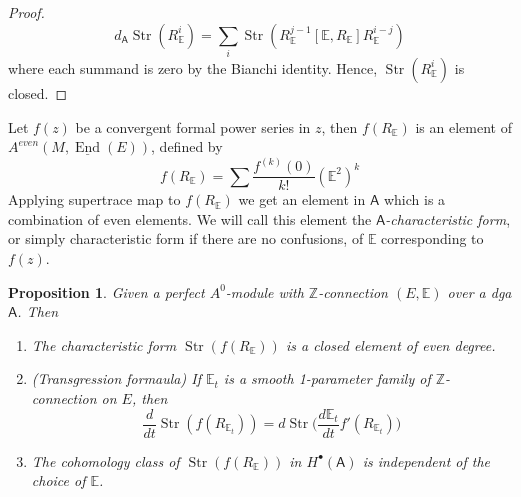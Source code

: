 \documentclass[12pt]{amsart}
\newtheorem{prop}[thm]{Proposition}
\theoremstyle{definition}
\theoremstyle{remark}
\numberwithin{equation}{section}
\newcommand{\Z}{{\mathbb{Z}}}
\newcommand{\1}{{\mathbb{1}}}
\newcommand{\End}{\operatorname{End}}
\newcommand{\str}{\operatorname{Str}}
\begin{document}
\begin{proof}
\begin{equation*}
    d_{\mathsf{A}}\str(R_{\mathbb{E}}^{i}) = \sum_i \str(R_{\mathbb{E}}^{j - 1}[\mathbb{E}, R_{\mathbb{E}}]R_{\mathbb{E}}^{i-j})
\end{equation*}
where each summand is zero by the Bianchi identity. Hence, $\str(R_{\mathbb{E}}^{i})$ is closed.
\end{proof}
Let $f(z)$ be a convergent formal power series in $z$, then $f(R_{\mathbb{E}})$ is an element of $A^{even}(M, \underline{\End}(E))$, defined by
\begin{equation*}
    f(R_{\mathbb{E}}) = \sum \frac{f^{(k)}(0)}{k!} (\mathbb{E}^2)^k
\end{equation*}
Applying supertrace map to $f(R_{\mathbb{E}})$ we get an element in $\mathsf{A}$ which is a combination of even elements. We will call this element the {\it $\mathsf{A}$-characteristic form}, or simply characteristic form if there are no confusions, of $\mathbb{E}$ corresponding to $f(z)$.
\begin{prop}
Given a perfect $A^0$-module with $\Z$-connection $(E, \mathbb{E})$ over a dga $\mathsf{A}$. Then 
\begin{enumerate}
    \item The characteristic form $\str(f(R_{\mathbb{E}}))$ is a closed element of even degree.
    \item  (Transgression formaula) If $\mathbb{E}_t$ is a smooth 1-parameter family of $\Z$-connection on $E$, then 
    \begin{equation}
        \frac{d}{dt}\str (f(R_{\mathbb{E}_t})) = d \str\Big(\frac{d \mathbb{E}_t}{dt} f'(R_{\mathbb{E}_t})\Big)
    \end{equation}
    \item The cohomology class of  $\str(f(R_{\mathbb{E}}))$ in $H^{\bullet}(\mathsf{A})$ is independent of the choice of $\mathbb{E}$. 
    
\end{enumerate}

\end{prop}
\end{document}
